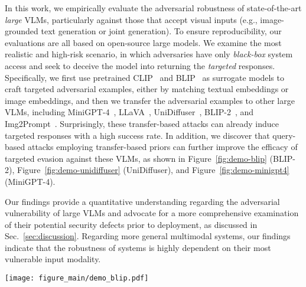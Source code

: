 In this work, we empirically evaluate the adversarial robustness of state-of-the-art \emph{large} VLMs, particularly against those that accept visual inputs (e.g., image-grounded text generation or joint generation). To ensure reproducibility, our evaluations are all based on open-source large models. We examine the most realistic and high-risk scenario, in which adversaries have only \emph{black-box} system access and seek to deceive the model into returning the \emph{targeted} responses. Specifically, we first use pretrained CLIP~\citep{radford2021learning,sun2023eva} and BLIP~\citep{li2022blip} as surrogate models to craft targeted adversarial examples, either by matching textual embeddings or image embeddings, and then we transfer the adversarial examples to other large VLMs, including MiniGPT-4~\citep{zhu2023minigpt}, LLaVA~\citep{liu2023llava}, UniDiffuser~\citep{bao2022one}, BLIP-2~\citep{li2023blip}, and Img2Prompt~\citep{guoimages}. Surprisingly, these transfer-based attacks can already induce targeted responses with a high success rate. In addition, we discover that query-based attacks employing transfer-based priors can further improve the efficacy of targeted evasion against these VLMs, as shown in Figure~\ref{fig:demo-blip} (BLIP-2), Figure~\ref{fig:demo-unidiffuser} (UniDiffuser), and Figure~\ref{fig:demo-minigpt4} (MiniGPT-4).

Our findings provide a quantitative understanding regarding the adversarial vulnerability of large VLMs and advocate for a more comprehensive examination of their potential security defects prior to deployment, as discussed in Sec.~\ref{sec:discussion}. Regarding more general multimodal systems, our findings indicate that the robustness of systems is highly dependent on their most vulnerable input modality.

\begin{figure*}[t]
\vspace{-0.cm}
    \centering
    \texttt{[image: figure\_main/demo\_blip.pdf]}
    \caption{\textbf{Image captioning task implemented by BLIP-2.} Given an original text description (e.g., \texttt{an armchair in the shape of an avocado}), DALL-E~\citep{ramesh2021zero} is used to generate corresponding clean images. BLIP-2 accurately returns captioning text (e.g., \texttt{a stuffed chair in the shape of an avocado}) that analogous to the original text description on the clean image. After the clean image is maliciously perturbed by targeted adversarial noises, the adversarial image can mislead BLIP-2 to return a caption (e.g., \texttt{a pencil drawing of sports car is shown}) that semantically resembles the predefined targeted response (e.g., \texttt{a hand drawn sketch of a Porsche 911}). More examples such as attacking real-world image-text pairs are provided in our Appendix.
    }
    \label{fig:demo-blip}
    \vspace{-0.1cm}
\end{figure*}


